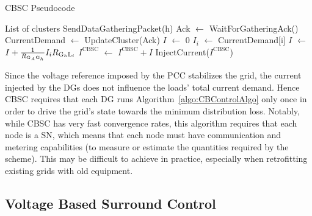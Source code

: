 \documentclass[journal]{IEEEtran}
\begin{document}
\begin{algorithm}
\caption{CBSC Pseudocode}\label{algo:CBControlAlgo}
\begin{algorithmic}[1]
\REQUIRE List of clusters
\STATE SendDataGatheringPacket(h) \label{line:DGPacket}
\STATE Ack $\leftarrow$ WaitForGatheringAck() \label{line:Ack}
\STATE CurrentDemand $\leftarrow$ UpdateCluster(Ack) \label{line:update}
\STATE $I$ $\leftarrow$ $0$ \label{line:InitCurrent}
\STATE $I_i$ $\leftarrow$ CurrentDemand[i] \label{line:SetPwDemand}
\STATE $\displaystyle I$ $\leftarrow$ $I+{1\over{R_{\text{G}_A\text{G}_h}}} I_i R_{\text{G}_h\text{L}_i}$ \label{line:ComputeOptC}
\ENDFOR
\STATE $I^{\text{CBSC}}$ $\leftarrow$ $I^{\text{CBSC}}+I$  \label{line:UpdateOptC}
\ENDFOR
\STATE InjectCurrent($I^{\text{CBSC}}$)  \label{line:Inject}
\end{algorithmic}
\end{algorithm}
Since the voltage reference imposed by the PCC stabilizes the grid, the current injected by the DGs does not influence the loads' total current demand. Hence CBSC requires that each DG runs Algorithm~\ref{algo:CBControlAlgo} only once in order to drive the grid's state towards the minimum distribution loss. Notably, while CBSC has very fast convergence rates, this algorithm requires that each node is a SN, which means that each node must have communication and metering capabilities (to measure or estimate the quantities required by the scheme). This may be difficult to  achieve in practice, especially when retrofitting existing grids with old equipment.

\subsection{Voltage Based Surround Control}
\label{ssec:VBControl}
\end{document}
